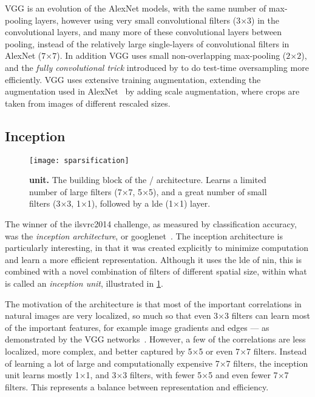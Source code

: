 \documentclass[thesis]{subfiles}
\begin{document}
VGG is an evolution of the AlexNet models, with the same number of max-pooling layers, however using very small convolutional filters ($3$$\times$$3$) in the convolutional layers, and many more of these convolutional layers between pooling, instead of the relatively large single-layers of convolutional filters in AlexNet ($7$$\times$$7$). In addition VGG uses small non-overlapping max-pooling ($2$$\times$$2$), and the \emph{fully convolutional trick} introduced by \citet{Sermanet2013overfeat} to do test-time oversampling more efficiently. VGG uses extensive training augmentation, extending the augmentation used in AlexNet~\citep{Krizhevsky2012} by adding scale augmentation, where crops are taken from images of different rescaled sizes. 

\subsection{Inception}\label{backgroundinception}
\begin{figure}
	\centering
	\texttt{[image: sparsification]}
	\caption[Illustration of the inception unit]{\textbf{ unit.} The building block of the / architecture. Learns a limited number of large filters (7$\times$7, 5$\times$5), and a great number of small filters (3$\times$3, 1$\times$1), followed by a \gls{lde} (1$\times$1) layer.}\label{fig:inceptionunit}
\end{figure}
The winner of the \gls{ilsvrc}2014 challenge, as measured by classification accuracy, was the \emph{\gls{inception} architecture}, or \gls{googlenet}~\citep{Szegedy2014going}. The \gls{inception} architecture is particularly interesting, in that it was created explicitly to minimize computation and learn a more efficient representation. Although it uses the \gls{lde} of \gls{nin}, this is combined with a novel combination of filters of different spatial size, within what is called an \emph{\gls{inception} unit}, illustrated in \cref{fig:inceptionunit}.

The motivation of the architecture is that most of the important correlations in natural images are very localized, so much so that even 3$\times$3 filters can learn most of the important features, for example image gradients and edges --- as demonstrated by the VGG networks~\citep{Simonyan2014verydeep}. However, a few of the correlations are less localized, more complex, and better captured by 5$\times$5 or even 7$\times$7 filters. Instead of learning a lot of large and computationally expensive 7$\times$7 filters, the \gls{inception} unit learns mostly 1$\times$1, and 3$\times$3 filters, with fewer 5$\times$5 and even fewer 7$\times$7 filters. This represents a balance between representation and efficiency.
\end{document}
